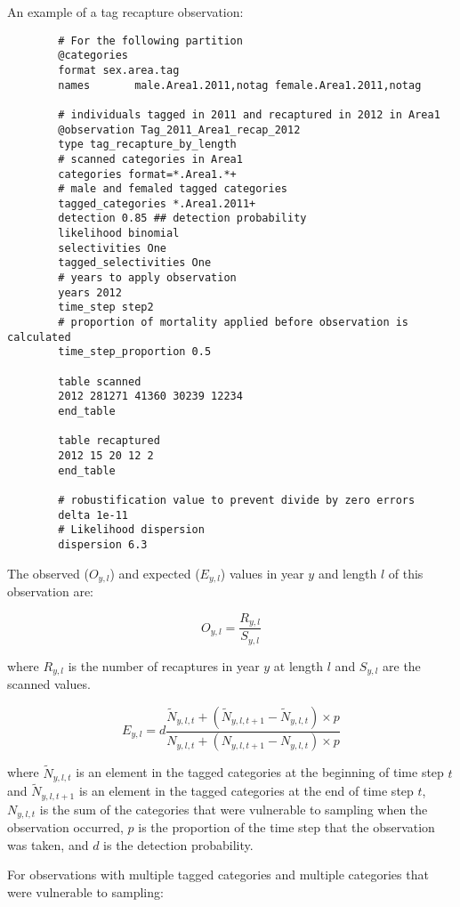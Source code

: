 An example of a tag recapture observation:

{\small{\begin{verbatim}
		# For the following partition
		@categories
		format sex.area.tag
		names  		male.Area1.2011,notag female.Area1.2011,notag
		
		# individuals tagged in 2011 and recaptured in 2012 in Area1
		@observation Tag_2011_Area1_recap_2012
		type tag_recapture_by_length
		# scanned categories in Area1
		categories format=*.Area1.*+
		# male and femaled tagged categories
		tagged_categories *.Area1.2011+
		detection 0.85 ## detection probability
		likelihood binomial
		selectivities One
		tagged_selectivities One
		# years to apply observation
		years 2012
		time_step step2
		# proportion of mortality applied before observation is calculated
		time_step_proportion 0.5
		
		table scanned
		2012 281271 41360 30239 12234
		end_table
		
		table recaptured
		2012 15 20 12 2
		end_table
		
		# robustification value to prevent divide by zero errors
		delta 1e-11
		# Likelihood dispersion
		dispersion 6.3
		\end{verbatim}}}

The observed ($O_{y,l}$) and expected ($E_{y,l}$) values in year $y$ and length $l$ of this observation are:

\begin{equation}
O_{y,l} = \frac{R_{y,l}}{S_{y,l}}
\end{equation}

where $R_{y,l}$ is the number of recaptures in year $y$ at length $l$ and $S_{y,l}$ are the scanned values.

\begin{equation}
E_{y,l} = d \frac{\tilde{N}_{y,l,t} +  (\tilde{N}_{y,l,t + 1} - \tilde{N}_{y,l,t}) \times p}
{N_{y,l,t} + (N_{y,l,t+1} - N_{y,l,t}) \times p}
\end{equation}

where $\tilde{N}_{y,l,t}$ is an element in the tagged categories at the beginning of time step $t$ and $\tilde{N}_{y,l,t + 1}$ is an element in the tagged categories at the end of time step $t$, $N_{y,l,t}$ is the sum of the categories that were vulnerable to sampling when the observation occurred, $p$ is the proportion of the time step that the observation was taken, and $d$ is the detection probability.

For observations with multiple tagged categories and multiple categories that were vulnerable to sampling:

